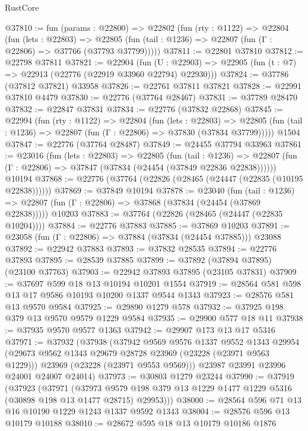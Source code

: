 \begin{lexlean}{RustCore}
\begin{coremodule}
@37810 := fun (params : @22800) =>
  @22802
    (fun (rty : @1122) =>
    @22804
      (fun (lets : @22803) =>
      @22805 (fun (tail : @1236) => @22807 (fun (Γ : @22806) => @37766 (@37793 @37799)))))
@37811 := @22801 @37810
@37812 := @22798 @37811
@37821 := @22904
    (fun (U : @22903) => @22905 (fun (t : @7) => @22913 (@22776 (@22919 @33960 @22794) @22930)))
@37824 := @37786 (@37812 @37821) @33958
@37826 := @22761 @37811 @37821
@37828 := @22991 @37810 @4479
@37830 := @22776 (@37764 @28467)
@37831 := @37789 @28470
@37832 := @22847 @37831
@37834 := @22776 (@37832 @22868)
@37845 := @22994
    (fun (rty : @1122) =>
    @22804
      (fun (lets : @22803) =>
      @22805 (fun (tail : @1236) => @22807 (fun (Γ : @22806) => @37830 (@37834 @37799)))))
    @1504
@37847 := @22776 (@37764 @28487)
@37849 := @24455 @37794 @33963
@37861 := @23016
    (fun (lets : @22803) =>
    @22805
      (fun (tail : @1236) =>
      @22807 (fun (Γ : @22806) => @37847 (@37834 (@24454 (@37849 @22836 @22838))))))
    @10194
@37868 := @22776 (@37764 (@22826 (@28465 (@24447 (@22835 (@10195 @22838))))))
@37869 := @37849 @10194
@37878 := @23040
    (fun (tail : @1236) => @22807 (fun (Γ : @22806) => @37868 (@37834 (@24454 (@37869 @22838)))))
    @10203
@37883 := @37764 (@22826 (@28465 (@24447 (@22835 @10204))))
@37884 := @22776 @37883
@37885 := @37869 @10203
@37891 := @23058 (fun (Γ : @22806) => @37884 (@37834 (@24454 @37885))) @23088
@37892 := @22942 @37883
@37893 := @37832 @28535
@37894 := @22776 @37893
@37895 := @28539 @37885
@37899 := @37892 (@37894 @37895) (@23100 @37763)
@37903 := @22942 @37893 @37895 (@23105 @37831)
@37909 := @37697 @599 @18 @13 @10194 @10201 @1554
@37919 := @28564 @581 @598 @13 @17 @9586 @10193 @10200 @1337 @9544 @1343
@37923 := @28576 @581 @13 @9570 @9584
@37925 := @29890 @1279 @578
@37932 := @37925 @198 @379 @13 @9570 @9579 @1229 @9584
@37935 := @29900 @577 @18 @11
@37938 := @37935 @9570 @9577 @1363
@37942 := @29907 @173 @13 @17 @5316
@37971 := @37932
    (@37938
      (@37942
        @9569
        @9576
        @1337
        @9552
        @1343
        @29954
        (@29673 @9562 @1343 @29679 @28728 @23969 (@23228 (@23971 @9563 @1229)))
        @23969
        (@23228 (@23971 @9553 @9569)))
      @23987
      @23991
      @23996
      @24001
      @24007
      @24014)
@37973 := @30803 @1279 @23244
@37990 := @37919
    (@37923
      (@37971
        (@37973 @9579 @198 @379 @13 @1229 @1477 @1229 @5316 (@30898 @198 @13 @1477 @28715) @29953)))
@38000 := @28564 @596 @71 @13 @16 @10190 @1229 @1243 @1337 @9592 @1343
@38004 := @28576 @596 @13 @10179 @10188
@38010 := @28672 @595 @18 @13 @10179 @10186 @1876

\end{coremodule}
\end{lexlean}
